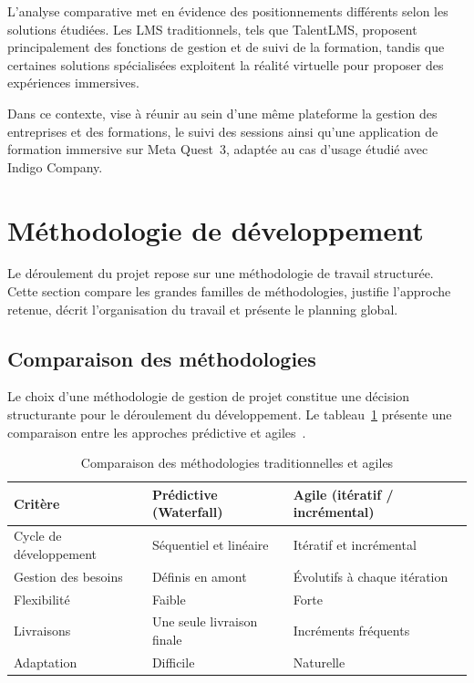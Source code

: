 L'analyse comparative met en évidence des positionnements différents selon les solutions
étudiées. Les LMS traditionnels, tels que TalentLMS, proposent principalement des fonctions
de gestion et de suivi de la formation, tandis que certaines solutions spécialisées
exploitent la réalité virtuelle pour proposer des expériences immersives.

Dans ce contexte, \tynassit{} vise à réunir au sein d'une même plateforme la gestion
des entreprises et des formations, le suivi des sessions ainsi qu'une application
de formation immersive sur Meta Quest~3, adaptée au cas d'usage étudié avec Indigo Company.

\section{Méthodologie de développement}

Le déroulement du projet repose sur une méthodologie de travail structurée. Cette section
compare les grandes familles de méthodologies, justifie l'approche retenue, décrit
l'organisation du travail et présente le planning global.

\subsection{Comparaison des méthodologies}

Le choix d'une méthodologie de gestion de projet constitue une décision structurante pour
le déroulement du développement. Le tableau~\ref{tab:methodo} présente une comparaison entre
les approches prédictive et agiles~\cite{agile2020}.

\begin{table}[H]
  \centering
  \begin{tabularx}{\textwidth}{lXX}
    \toprule
    \textbf{Critère} & \textbf{Prédictive (Waterfall)} & \textbf{Agile (itératif / incrémental)} \\
    \midrule
    Cycle de développement & Séquentiel et linéaire & Itératif et incrémental \\
    Gestion des besoins & Définis en amont & Évolutifs à chaque itération \\
    Flexibilité & Faible & Forte \\
    Livraisons & Une seule livraison finale & Incréments fréquents \\
    Adaptation & Difficile & Naturelle \\
    \bottomrule
  \end{tabularx}
  \caption{Comparaison des méthodologies traditionnelles et agiles}
  \label{tab:methodo}
\end{table}

